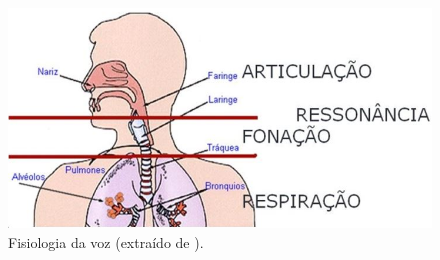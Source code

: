 \documentclass[a4paper,12pt,twoside,openright]{report}
\begin{document}
\begin{figure}[H]
\centering
\includegraphics[width=13cm]{figuras/fisiologia-da-voz.png}		\caption{Fisiologia da voz (extra\'{i}do de  \cite{voz}).}
\label{figura:trato_vocal}
\end{figure}
\end{document}
